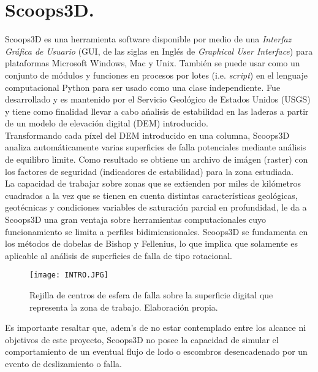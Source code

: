 \chapter{Scoops3D.}
\label{chap_Scoops3d}

Scoops3D es una herramienta software disponible por medio de una \emph{Interfaz Gr\'afica de Usuario} (GUI, de las siglas en Ingl\'es de \textit{Graphical User Interface}) para plataformas Microsoft Windows, Mac y Unix. Tambi\'en se puede usar como un conjunto de m\'odulos y funciones en procesos por lotes (i.e. \textit{script}) en el lenguaje computacional Python para ser usado como una clase independiente. Fue desarrollado y es mantenido por el Servicio Geol\'ogico de Estados Unidos (USGS) y tiene como finalidad llevar a cabo a\'nalisis de estabilidad en las laderas a partir de un modelo de elevaci\'on digital (DEM) introducido.\\

Transformando cada p\'ixel del DEM introducido en una columna, Scoops3D analiza autom\'aticamente varias superficies de falla potenciales mediante an\'alisis de equilibro limite.  Como resultado se obtiene un archivo de im\'agen (raster) con los factores de seguridad (indicadores de estabilidad) para la zona estudiada.\\

La capacidad de trabajar sobre zonas que se extienden por miles de kil\'ometros cuadrados a la vez que se tienen en cuenta distintas caracter\'isticas geol\'ogicas, geot\'ecnicas y condiciones variables de saturaci\'on parcial en profundidad, le da a Scoops3D una gran ventaja sobre herramientas computacionales cuyo funcionamiento se limita a perfiles bidimiensionales.
Scoops3D se fundamenta en los m\'etodos de dobelas de Bishop y Fellenius, lo que implica que solamente es aplicable al an\'alisis de superficies de falla de tipo rotacional.

\begin{figure}[H]
\centering
\texttt{[image: INTRO.JPG]}
\caption{Rejilla de centros de esfera de falla sobre la superficie digital que representa la zona de trabajo. Elaboraci\'on propia.}
\end{figure}
Es importante resaltar que, adem\a's de no estar contemplado entre los alcance ni objetivos de este proyecto, Scoops3D no posee la capacidad de simular el comportamiento de un eventual flujo de lodo o escombros desencadenado por un evento de deslizamiento o falla. 
